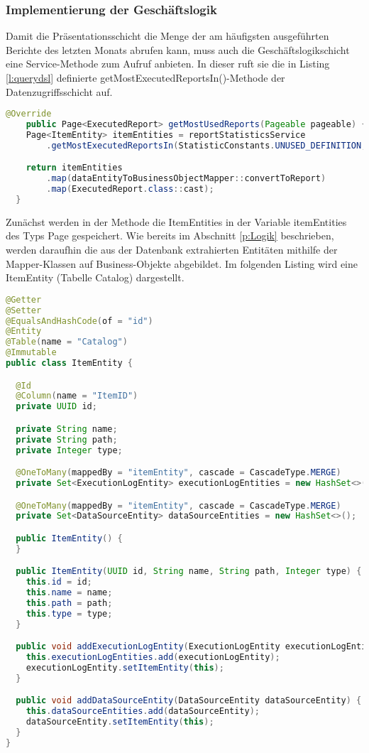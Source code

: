 \subsubsection{Implementierung der Geschäftslogik}
\label{sec:ImplementierungGeschaeftslogik}
Damit die Präsentationsschicht die Menge der am häufigsten ausgeführten Berichte des letzten Monats abrufen kann, muss auch die Geschäftslogikschicht eine Service-Methode zum Aufruf anbieten. In dieser ruft sie die in Listing \ref{l:querydsl} definierte getMostExecutedReportsIn()-Methode der Datenzugriffsschicht auf.
\begin{lstlisting}[language=Java,caption={getMostUsedReports()},label={l:getMostUsedReports}]
	@Override
  	public Page<ExecutedReport> getMostUsedReports(Pageable pageable) {
    Page<ItemEntity> itemEntities = reportStatisticsService
        .getMostExecutedReportsIn(StatisticConstants.UNUSED_DEFINITION, pageable);

    return itemEntities
        .map(dataEntityToBusinessObjectMapper::convertToReport)
        .map(ExecutedReport.class::cast);
  }
\end{lstlisting}
Zunächst werden in der Methode die ItemEntities in der Variable itemEntities des Typs Page gespeichert.
Wie bereits im Abschnitt \ref{p:Logik} beschrieben, werden daraufhin die aus der Datenbank extrahierten Entitäten mithilfe der Mapper-Klassen auf Business-Objekte abgebildet. Im folgenden Listing wird eine ItemEntity (Tabelle Catalog) dargestellt.
\begin{lstlisting}[language=Java,caption={ItemEntity}]
@Getter
@Setter
@EqualsAndHashCode(of = "id")
@Entity
@Table(name = "Catalog")
@Immutable
public class ItemEntity {

  @Id
  @Column(name = "ItemID")
  private UUID id;

  private String name;
  private String path;
  private Integer type;

  @OneToMany(mappedBy = "itemEntity", cascade = CascadeType.MERGE)
  private Set<ExecutionLogEntity> executionLogEntities = new HashSet<>();

  @OneToMany(mappedBy = "itemEntity", cascade = CascadeType.MERGE)
  private Set<DataSourceEntity> dataSourceEntities = new HashSet<>();

  public ItemEntity() {
  }

  public ItemEntity(UUID id, String name, String path, Integer type) {
    this.id = id;
    this.name = name;
    this.path = path;
    this.type = type;
  }

  public void addExecutionLogEntity(ExecutionLogEntity executionLogEntity) {
    this.executionLogEntities.add(executionLogEntity);
    executionLogEntity.setItemEntity(this);
  }

  public void addDataSourceEntity(DataSourceEntity dataSourceEntity) {
    this.dataSourceEntities.add(dataSourceEntity);
    dataSourceEntity.setItemEntity(this);
  }
}
\end{lstlisting}
